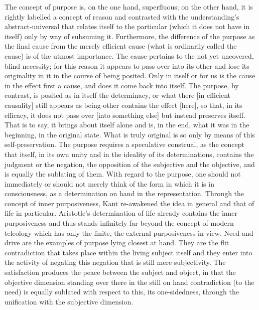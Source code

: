     The concept of purpose is, on the one hand, superfluous;
    on the other hand, it is rightly labelled a concept of reason and
    contrasted with the understanding's abstract-universal that
    relates itself to the particular (which it does not have in itself)
    only by way of subsuming it.
    Furthermore, the difference of the purpose as the final cause
    from the merely efficient cause (what is ordinarily called the cause)
    is of the utmost importance.
    The cause pertains to the not yet uncovered, blind necessity;
    for this reason it appears to pass over into its other and
    lose its originality in it in the course of being posited.
    Only in itself or for us is the cause in the effect first a cause,
    and does it come back into itself.
    The purpose, by contrast, is posited as in itself the determinacy,
    or what there [in efficient causality] still appears as being-other
    contains the effect [here], so that, in its efficacy,
    it does not pass over [into something else] but instead preserves itself.
    That is to say, it brings about itself alone and is, in the end,
    what it was in the beginning, in the original state.
    What is truly original is so only by means of this self-preservation.
    The purpose requires a speculative construal, as the concept that itself,
    in its own unity and in the ideality of its determinations,
    contains the judgment or the negation,
    the opposition of the subjective and the objective,
    and is equally the sublating of them.
    With regard to the purpose, one should not immediately or
    should not merely think of the form in which it is in consciousness,
    as a determination on hand in the representation.
    Through the concept of inner purposiveness,
    Kant re-awakened the idea in general and that of life in particular.
    Aristotle's determination of life already contains the inner purposiveness and
    thus stands infinitely far beyond the concept of modern teleology
    which has only the finite, the external purposiveness in view.
    Need and drive are the examples of purpose lying closest at hand.
    They are the flit contradiction that takes place within the living
    subject itself and they enter into the activity of negating this
    negation that is still mere subjectivity.
    The satisfaction produces the peace between the subject and object,
    in that the objective dimension standing over there in the still on hand
    contradiction (to the need) is equally sublated with respect to this,
    its one-sidedness, through the unification with the subjective dimension.
